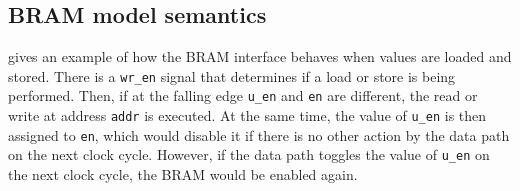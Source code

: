 
\subsection{BRAM model semantics}%
\label{sec:hg:bram-model-semantics}

 gives an example of how the \gls{BRAM} interface
behaves when values are loaded and stored.  There is a \texttt{wr\_en} signal
that determines if a load or store is being performed.  Then, if at the falling
edge \texttt{u\_en} and \texttt{en} are different, the read or write at address
\texttt{addr} is executed.  At the same time, the value of \texttt{u\_en} is
then assigned to \texttt{en}, which would disable it if there is no other action
by the data path on the next clock cycle.  However, if the data path toggles the
value of \texttt{u\_en} on the next clock cycle, the \gls{BRAM} would be enabled
again.


